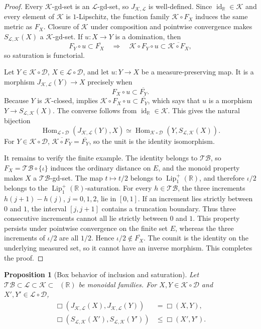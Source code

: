 \documentclass{amsart}
\theoremstyle{plain}
\newtheorem{proposition}[theorem]{Proposition}
\theoremstyle{definition}
\theoremstyle{remark}
\newcommand{\R}{\mathbb{R}}
\newcommand{\D}{\mathcal{D}}
\renewcommand{\L}{\mathcal{L}}
\newcommand{\K}{\mathcal{K}}
\newcommand{\TB}{\mathcal{TB}}
\newcommand{\Lup}{\operatorname{Lip}^{+}_{1}(\R)}
\DeclareMathOperator{\lipone}{Lip_1}
\begin{document}
\begin{proof}
Every $\K$-gd-set is an $\L$-gd-set, so $J_{\K,\L}$ is well-defined.  Since
$\operatorname{id}_{\R}\in\K$ and every element of $\K$ is
$1$-Lipschitz, the function family $\K\circ F_X$ induces the same metric as
$F_X$.  Closure of $\K$ under composition and pointwise convergence makes
$S_{\L,\K}(X)$ a $\K$-gd-set.  If $u\colon X\to Y$ is a domination, then
\[
F_Y\circ u\subset\overline{F_X}
\quad\Longrightarrow\quad
\K\circ F_Y\circ u\subset\overline{\K\circ F_X},
\]
so saturation is functorial.

Let $Y\in\K\circ\D$, $X\in\L\circ\D$, and let $u\colon Y\to X$ be a
measure-preserving map.  It is a morphism $J_{\K,\L}(Y)\to X$ precisely
when
\begin{equation} \label{eq:coarsening-hom-condition} F_X\circ u\subset\overline{F_Y}. \end{equation}
Because $Y$ is $\K$-closed,  implies
$\K\circ F_X\circ u\subset\overline{F_Y}$, which says that $u$ is a
morphism $Y\to S_{\L,\K}(X)$.  The converse follows from
$\operatorname{id}_{\R}\in\K$.  This gives the natural bijection
\[
\operatorname{Hom}_{\L\circ\D}(J_{\K,\L}(Y),X)
\simeq
\operatorname{Hom}_{\K\circ\D}(Y,S_{\L,\K}(X)).
\]
For $Y\in\K\circ\D$,
$\overline{\K\circ F_Y}=\overline{F_Y}$, so the unit is the identity
isomorphism.

It remains to verify the finite example.  The identity belongs to $\TB$, so
$F_X=\TB\circ\{\iota\}$ induces the ordinary distance on $E$, and the
monoid property makes $X$ a $\TB$-gd-set.  The map $t\mapsto t/2$ belongs
to $\Lup$, and therefore $\iota/2$ belongs to the $\Lup$-saturation.  For
every $h\in\TB$, the three increments
$h(j+1)-h(j)$, $j=0,1,2$, lie in $[0,1]$.  If an increment lies strictly
between $0$ and $1$, the interval $[j,j+1]$ contains a truncation boundary.
Thus three consecutive increments cannot all lie strictly between $0$ and
$1$.  This property persists under pointwise convergence on the finite set
$E$, whereas the three increments of $\iota/2$ are all $1/2$.  Hence
$\iota/2\notin\overline{F_X}$.  The counit is the identity on the underlying
measured set, so it cannot have an inverse morphism.  This completes the
proof.
\end{proof}

\begin{proposition}[Box behavior of inclusion and saturation]
\label{prop:coarsening-box}
Let $\TB\subset\L\subset\K\subset\lipone(\R)$ be monoidal families.  For
$X,Y\in\K\circ\D$ and $X',Y'\in\L\circ\D$,
\begin{align}
\Box(J_{\K,\L}(X),J_{\K,\L}(Y))&=\Box(X,Y), \label{eq:coarsening-inclusion-isometry}\\
\Box(S_{\L,\K}(X'),S_{\L,\K}(Y'))&\leq\Box(X',Y'). \label{eq:coarsening-saturation-nonexpansive}
\end{align}
\end{proposition}
\end{document}
